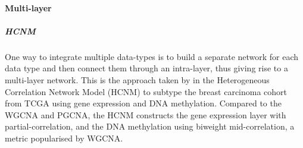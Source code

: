 
\paragraph*{Multi-layer} \label{s:lit:multi-layer}

\subparagraph*{HCNM} \label{s:lit:HCNM}

One way to integrate multiple data-types is to build a separate network for each data type and then connect them through an intra-layer, thus giving rise to a multi-layer network. This is the approach taken by \citet{Vangimalla2021-fc} in the Heterogeneous Correlation Network Model (HCNM) to subtype the breast carcinoma cohort from TCGA using gene expression and DNA methylation. Compared to the WGCNA and PGCNA, the HCNM constructs the gene expression layer with partial-correlation, and the DNA methylation using biweight mid-correlation, a metric popularised by WGCNA. 

